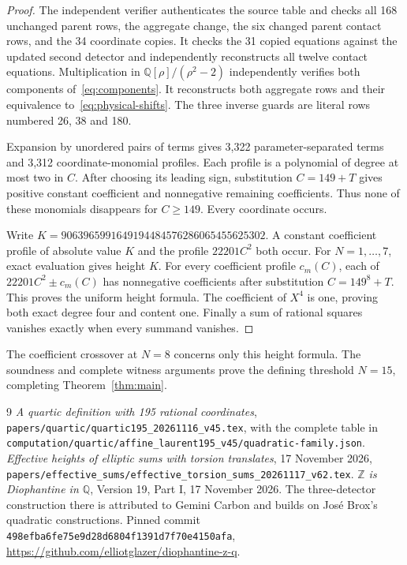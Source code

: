 \documentclass[11pt,a4paper]{article}
\newcommand{\Q}{\mathbb Q}\newcommand{\Z}{\mathbb Z}
\begin{document}
\begin{proof}
The independent verifier authenticates the source table and checks
all 168 unchanged parent rows, the aggregate change, the six
changed parent contact rows, and the 34 coordinate copies. It checks
the 31 copied equations against the updated second detector and
independently reconstructs all twelve contact equations. Multiplication in
$\Q[\rho]/(\rho^2-2)$ independently verifies both components
of~\eqref{eq:components}. It reconstructs both aggregate rows and
their equivalence to~\eqref{eq:physical-shifts}. The three inverse
guards are literal rows numbered 26, 38 and 180.

Expansion by unordered pairs of terms gives 3,322 parameter-separated
terms and 3,312 coordinate-monomial profiles. Each profile is a
polynomial of degree at most two in $C$. After choosing its leading
sign, substitution $C=149+T$ gives positive constant coefficient and
nonnegative remaining coefficients. Thus none of these monomials
disappears for $C\ge149$. Every coordinate occurs.

Write $K=9063965991649194484576286065455625302$. A constant coefficient
profile of absolute value $K$ and the profile $22201C^2$ both occur. For $N=1,\ldots,7$,
exact evaluation gives height $K$. For every coefficient profile
$c_m(C)$, each of $22201C^2\pm c_m(C)$ has nonnegative coefficients
after substitution $C=149^8+T$. This proves the uniform height
formula. The coefficient of $X^4$ is one, proving both exact degree
four and content one. Finally a sum of rational squares vanishes
exactly when every summand vanishes.
\end{proof}

The coefficient crossover at $N=8$ concerns only this height formula.
The soundness and complete witness arguments prove the defining
threshold $N=15$, completing Theorem~\ref{thm:main}.

\begin{thebibliography}{9}
\emph{A quartic definition with 195 rational coordinates},
\nolinkurl{papers/quartic/quartic195_20261116_v45.tex},
with the complete table in
\nolinkurl{computation/quartic/affine_laurent195_v45/quadratic-family.json}.
\emph{Effective heights of elliptic sums with torsion translates},
17 November 2026,
\nolinkurl{papers/effective_sums/effective_torsion_sums_20261117_v62.tex}.
\emph{$\Z$ is Diophantine in $\Q$}, Version 19, Part I,
17 November 2026. The three-detector construction there is attributed
to Gemini Carbon and builds on Jos\'e Brox's quadratic constructions.
Pinned commit
\texttt{498efba6fe75e9d28d6804f1391d7f70e4150afa},
\url{https://github.com/elliotglazer/diophantine-z-q}.
\end{thebibliography}
\end{document}
